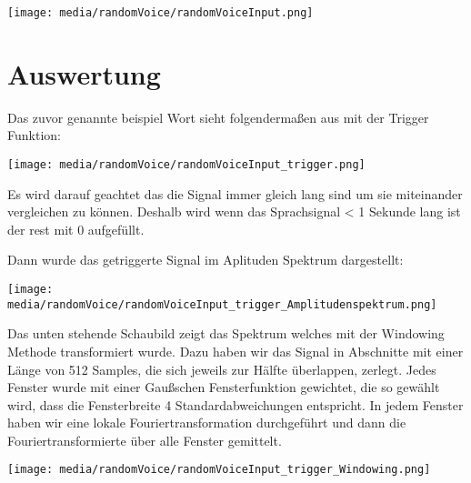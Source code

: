 \begin{center}
\texttt{[image: media/randomVoice/randomVoiceInput.png]}

\end{center}


\section{Auswertung}
\label{chap:VERSUCH_1_AUSWERTUNG}
Das zuvor genannte beispiel Wort sieht folgendermaßen aus mit der Trigger Funktion:

\begin{center}
\texttt{[image: media/randomVoice/randomVoiceInput\_trigger.png]}

\end{center}


Es wird darauf geachtet das die Signal immer gleich lang sind um sie miteinander vergleichen zu können. Deshalb wird wenn das Sprachsignal < 1 Sekunde lang ist der rest mit 0 aufgefüllt.


Dann wurde das getriggerte Signal im Aplituden Spektrum dargestellt:

\begin{center}
\texttt{[image: media/randomVoice/randomVoiceInput\_trigger\_Amplitudenspektrum.png]}
\end{center}


Das unten stehende Schaubild zeigt das Spektrum welches mit der Windowing Methode transformiert wurde.
Dazu haben wir das Signal in Abschnitte mit einer Länge von 512 Samples, die sich jeweils zur
Hälfte überlappen, zerlegt. Jedes Fenster wurde mit einer Gaußschen
Fensterfunktion gewichtet, die so gewählt wird, dass die Fensterbreite 4 Standardabweichungen
entspricht. In jedem Fenster haben wir eine lokale Fouriertransformation durchgeführt und
dann die Fouriertransformierte über alle Fenster gemittelt.

\begin{center}
\texttt{[image: media/randomVoice/randomVoiceInput\_trigger\_Windowing.png]}

\end{center}




